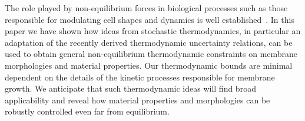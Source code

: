 \documentclass[amsmath,preprintnumbers,10pt,nofootinbib,prl,twocolumn]{revtex4-1}
\begin{document}
The role played by non-equilibrium forces in biological processes such as those responsible for modulating cell shapes and dynamics is well established~\cite{McMahon2005,Stachowiak2012,Chen2016,Turlier2016,Rao2001,Solon2006}. In this paper we have shown how ideas from stochastic thermodynamics, in particular an adaptation of the recently derived thermodynamic uncertainty relations, can be used to obtain general non-equilibrium thermodynamic constraints on membrane morphologies and material properties. Our thermodynamic bounds are minimal dependent on the details of the kinetic processes responsible for membrane growth. We anticipate that such thermodynamic ideas will find broad applicability and reveal how material properties and morphologies can be robustly controlled even far from equilibrium. 


\end{document}
